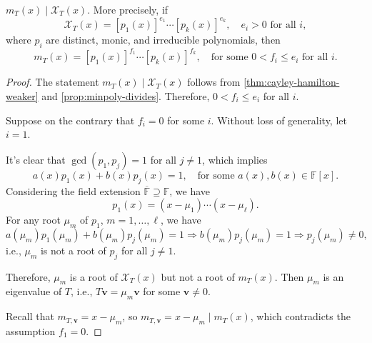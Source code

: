 \begin{corollary}\label{cor:cayley-hamiton-cor}
$m_T(x) \mid \mathcal{X}_T(x)$. More precisely, if
\[
\mathcal{X}_T(x) = [p_1(x)]^{e_1} \cdots [p_k(x)]^{e_k}, \quad e_i > 0 \text{ for all } i,
\]
where $p_i$ are distinct, monic, and irreducible polynomials, then
\[
m_T(x) = [p_1(x)]^{f_1} \cdots [p_k(x)]^{f_k}, \quad \text{for some } 0 < f_i \leq e_i \text{ for all } i.
\]
\end{corollary}

\begin{proof}
The statement $m_T(x) \mid \mathcal{X}_T(x)$ follows from \autoref{thm:cayley-hamilton-weaker} and \autoref{prop:minpoly-divides}. Therefore, $0 < f_i \leq e_i$ for all $i$.

Suppose on the contrary that $f_i = 0$ for some $i$. Without loss of generality, let $i = 1$.

It’s clear that $\gcd(p_1, p_j) = 1$ for all $j \neq 1$, which implies
\[
a(x)p_1(x) + b(x)p_j(x) = 1, \quad \text{for some } a(x), b(x) \in \mathbb{F}[x].
\]
Considering the field extension $\overline{\mathbb{F}} \supseteq \mathbb{F}$, we have
\[
p_1(x) = (x - \mu_1) \cdots (x - \mu_\ell).
\]
For any root $\mu_m$ of $p_1$, $m = 1, \ldots, \ell$, we have
\[
a(\mu_m)p_1(\mu_m) + b(\mu_m)p_j(\mu_m) = 1 \Rightarrow b(\mu_m)p_j(\mu_m) = 1 \Rightarrow p_j(\mu_m) \neq 0,
\]
i.e., $\mu_m$ is not a root of $p_j$ for all $j \neq 1$.

Therefore, $\mu_m$ is a root of $\mathcal{X}_T(x)$ but not a root of $m_T(x)$. Then $\mu_m$ is an eigenvalue of $T$, i.e., $T \mathbf{v} = \mu_m \mathbf{v}$ for some $\mathbf{v} \neq 0$.

Recall that $m_{T,\mathbf{v}} = x - \mu_m$, so $m_{T,\mathbf{v}} = x - \mu_m \mid m_T(x)$, which contradicts the assumption $f_1 = 0$.
\end{proof}

